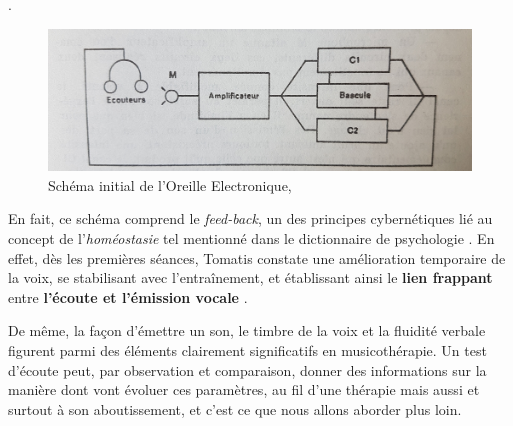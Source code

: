 .
\begin{figure}
	\centering
	\includegraphics[width=0.7\linewidth]{images/oreilleelectro.jpg}
	\caption[L'Oreille
          Electronique: schéma]{Schéma initial de l'Oreille
          Electronique,\autocite[p.~97] {tomatisoreilletvie}}
\label{oreilleelectro}
\end{figure}
En fait, ce schéma comprend le\textit{ feed-back}, un des principes
cybernétiques lié au concept de l'\textit{homéostasie} tel
mentionné dans le dictionnaire de
psychologie \autocite[298]{doronparot}.
En effet, dès les premières
séances, Tomatis constate une amélioration temporaire de la voix, se
stabilisant avec l'entraînement, et établissant ainsi le
\textbf{lien frappant} entre\textbf{ l'écoute et
  l'émission vocale} \autocite {tomatisoreilletvie}.

De même, la façon d'émettre un son, le timbre de la voix et la fluidité
verbale figurent parmi des
éléments clairement significatifs en musicothérapie.
Un test d'écoute peut, par observation et comparaison, donner des informations sur la manière dont vont évoluer ces paramètres, au fil d'une thérapie mais aussi et surtout à son aboutissement, et c'est ce que nous allons aborder plus loin.





